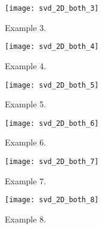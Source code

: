 \documentclass[11pt,titlepage,fleqn]{article}
\begin{document}
\clearpage\pagebreak
\begin{figure}
\hspace{-1cm}
\texttt{[image: svd\_2D\_both\_3]}
\caption[]
{{
Example 3.
\label{fig:ex3}
}}
\end{figure}

\clearpage\pagebreak
\begin{figure}
\hspace{-1cm}
\texttt{[image: svd\_2D\_both\_4]}
\caption[]
{{
Example 4.
\label{fig:ex4}
}}
\end{figure}

\clearpage\pagebreak
\begin{figure}
\hspace{-1cm}
\texttt{[image: svd\_2D\_both\_5]}
\caption[]
{{
Example 5.
\label{fig:ex5}
}}
\end{figure}

\clearpage\pagebreak
\begin{figure}
\hspace{-1cm}
\texttt{[image: svd\_2D\_both\_6]}
\caption[]
{{
Example 6.
\label{fig:ex6}
}}
\end{figure}

\clearpage\pagebreak
\begin{figure}
\hspace{-1cm}
\texttt{[image: svd\_2D\_both\_7]}
\caption[]
{{
Example 7.
\label{fig:ex7}
}}
\end{figure}

\clearpage\pagebreak
\begin{figure}
\hspace{-1cm}
\texttt{[image: svd\_2D\_both\_8]}
\caption[]
{{
Example 8.
\label{fig:ex8}
}}
\end{figure}

\end{document}
